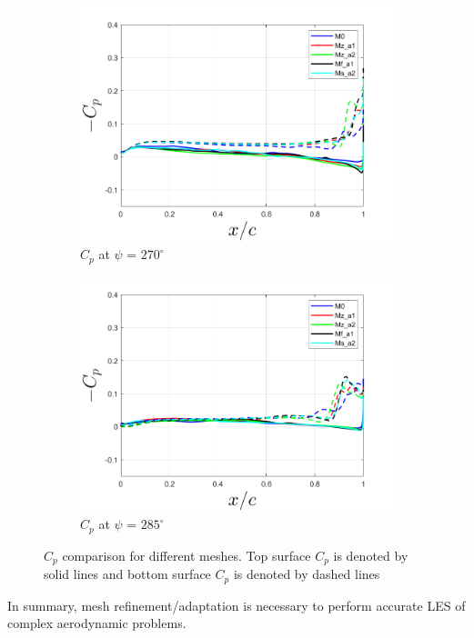 \begin{figure}[H]
\begin{subfigure}[b]{0.475\textwidth}
\includegraphics[width=1\textwidth]{figures/Results/Cp_plots/Cp_ph_270.png}
\caption{ $C_p$ at $\psi$ = $270^\circ$}
\label{fig:Cp_270}
\end{subfigure}
\begin{subfigure}[b]{0.475\textwidth}
\centering
\includegraphics[width=1\textwidth]{figures/Results/Cp_plots/Cp_ph_285.png}
\caption{ $C_p$ at $\psi$ = $285^\circ$}
\label{fig:Cp_285}
\end{subfigure}
\caption{$C_p$ comparison for different meshes. Top surface $C_p$ is denoted by solid lines and bottom surface $C_p$ is denoted by dashed lines}
\label{fig:Cp_plots}
\end{figure}


In summary, mesh refinement/adaptation is necessary to perform accurate LES of complex aerodynamic problems.
